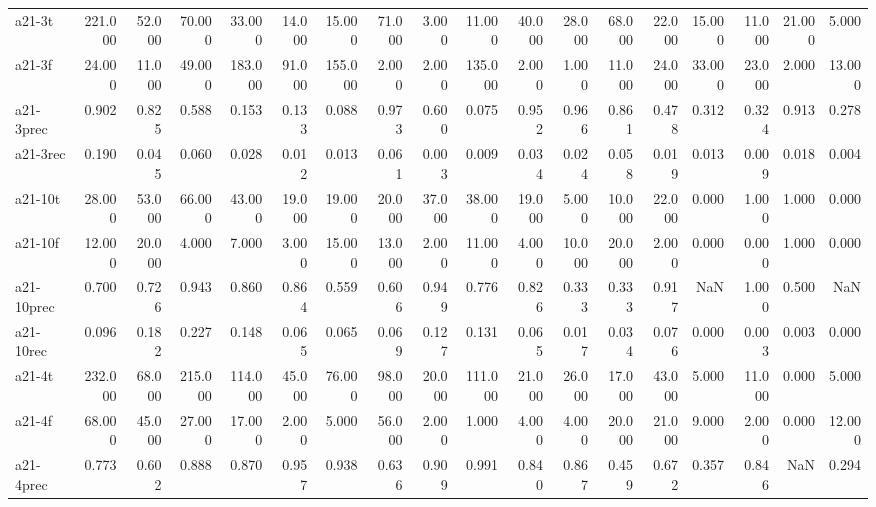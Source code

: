 \begin{tabular}{lrrrrrrrrrrrrrrrrr}
a21-3t     &  221.000 &   52.000 &   70.000 &     33.000 &  14.000 &   15.000 &      71.000 &    3.000 &          11.000 &      40.000 &   28.000 &      68.000 &      22.000 &   15.000 &  11.000 &  21.000 &   5.000 \\
a21-3f     &   24.000 &   11.000 &   49.000 &    183.000 &  91.000 &  155.000 &       2.000 &    2.000 &         135.000 &       2.000 &    1.000 &      11.000 &      24.000 &   33.000 &  23.000 &   2.000 &  13.000 \\
a21-3prec  &    0.902 &    0.825 &    0.588 &      0.153 &   0.133 &    0.088 &       0.973 &    0.600 &           0.075 &       0.952 &    0.966 &       0.861 &       0.478 &    0.312 &   0.324 &   0.913 &   0.278 \\
a21-3rec   &    0.190 &    0.045 &    0.060 &      0.028 &   0.012 &    0.013 &       0.061 &    0.003 &           0.009 &       0.034 &    0.024 &       0.058 &       0.019 &    0.013 &   0.009 &   0.018 &   0.004 \\
a21-10t    &   28.000 &   53.000 &   66.000 &     43.000 &  19.000 &   19.000 &      20.000 &   37.000 &          38.000 &      19.000 &    5.000 &      10.000 &      22.000 &    0.000 &   1.000 &   1.000 &   0.000 \\
a21-10f    &   12.000 &   20.000 &    4.000 &      7.000 &   3.000 &   15.000 &      13.000 &    2.000 &          11.000 &       4.000 &   10.000 &      20.000 &       2.000 &    0.000 &   0.000 &   1.000 &   0.000 \\
a21-10prec &    0.700 &    0.726 &    0.943 &      0.860 &   0.864 &    0.559 &       0.606 &    0.949 &           0.776 &       0.826 &    0.333 &       0.333 &       0.917 &      NaN &   1.000 &   0.500 &     NaN \\
a21-10rec  &    0.096 &    0.182 &    0.227 &      0.148 &   0.065 &    0.065 &       0.069 &    0.127 &           0.131 &       0.065 &    0.017 &       0.034 &       0.076 &    0.000 &   0.003 &   0.003 &   0.000 \\
a21-4t     &  232.000 &   68.000 &  215.000 &    114.000 &  45.000 &   76.000 &      98.000 &   20.000 &         111.000 &      21.000 &   26.000 &      17.000 &      43.000 &    5.000 &  11.000 &   0.000 &   5.000 \\
a21-4f     &   68.000 &   45.000 &   27.000 &     17.000 &   2.000 &    5.000 &      56.000 &    2.000 &           1.000 &       4.000 &    4.000 &      20.000 &      21.000 &    9.000 &   2.000 &   0.000 &  12.000 \\
a21-4prec  &    0.773 &    0.602 &    0.888 &      0.870 &   0.957 &    0.938 &       0.636 &    0.909 &           0.991 &       0.840 &    0.867 &       0.459 &       0.672 &    0.357 &   0.846 &     NaN &   0.294 \\

\end{tabular}
